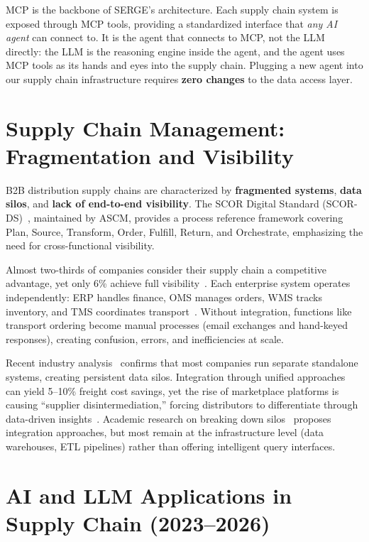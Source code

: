 \documentclass[12pt,a4paper]{report}
\begin{document}
MCP is the backbone of SERGE's architecture. Each supply chain system is exposed through MCP tools, providing a standardized interface that \textit{any AI agent} can connect to. It is the agent that connects to MCP, not the LLM directly: the LLM is the reasoning engine inside the agent, and the agent uses MCP tools as its hands and eyes into the supply chain. Plugging a new agent into our supply chain infrastructure requires \textbf{zero changes} to the data access layer.

\section{Supply Chain Management: Fragmentation and Visibility}

B2B distribution supply chains are characterized by \textbf{fragmented systems}, \textbf{data silos}, and \textbf{lack of end-to-end visibility}. The SCOR Digital Standard (SCOR-DS)~\cite{scords2022}, maintained by ASCM, provides a process reference framework covering Plan, Source, Transform, Order, Fulfill, Return, and Orchestrate, emphasizing the need for cross-functional visibility.

Almost two-thirds of companies consider their supply chain a competitive advantage, yet only 6\% achieve full visibility~\cite{geodis2024}. Each enterprise system operates independently: ERP handles finance, OMS manages orders, WMS tracks inventory, and TMS coordinates transport~\cite{aws2024sync}. Without integration, functions like transport ordering become manual processes (email exchanges and hand-keyed responses), creating confusion, errors, and inefficiencies at scale.

Recent industry analysis~\cite{omniful2026} confirms that most companies run separate standalone systems, creating persistent data silos. Integration through unified approaches can yield 5--10\% freight cost savings, yet the rise of marketplace platforms is causing ``supplier disintermediation,'' forcing distributors to differentiate through data-driven insights~\cite{globe3distribution}. Academic research on breaking down silos~\cite{irjmets2024silos} proposes integration approaches, but most remain at the infrastructure level (data warehouses, ETL pipelines) rather than offering intelligent query interfaces.

\section{AI and LLM Applications in Supply Chain (2023--2026)}
\end{document}
